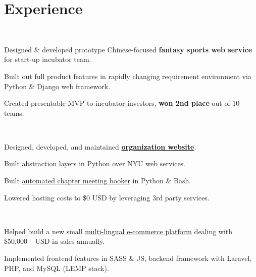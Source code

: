 \documentclass[]{hieudo-build}
\begin{document}
\begin{minipage}[t]{0.65\textwidth} 

\section{Experience}

\\
\vspace{0.9em} %
\begin{tightemize}
\item Designed \& developed prototype Chinese-focused {\bf fantasy sports web service} for start-up incubator team.
\item Built out full product features in rapidly changing requirement environment via Python \& Django web framework.
\item Created presentable MVP to incubator investors, {\bf won 2nd place} out of 10 teams.
\end{tightemize}
\sectionsep

\\
\begin{tightemize}
\item Designed, developed, and maintained  {\bf \href{https://www.skullhouse.nyc}{organization website}}.
\item Built abstraction layers in Python over NYU web services.
\item Built \href{https://github.com/JasonYao/Bobst-Room-Automator}{automated chapter meeting booker} in Python \& Bash.
\item Lowered hosting costs to \$0 USD by leveraging 3rd party services.
\end{tightemize}
\sectionsep

 \\
\begin{tightemize}
\item Helped build a new small \href{http://hivi.us/}{multi-lingual e-commerce platform} dealing with \$50,000+ USD in sales annually.
\item Implemented frontend features in SASS \& JS, backend framework with Laravel, PHP, and MySQL (LEMP stack).
\end{tightemize}
\sectionsep


\end{minipage}
\end{document}
